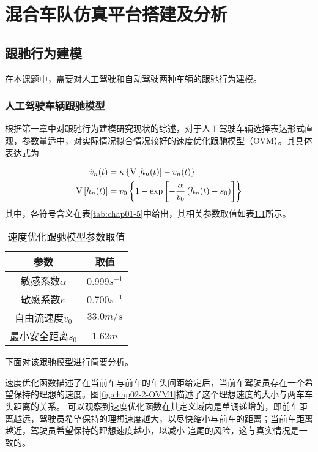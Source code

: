 
\chapter{混合车队仿真平台搭建及分析}

\section{跟驰行为建模}
\label{sec:2.2}

在本课题中，需要对人工驾驶和自动驾驶两种车辆的跟驰行为建模。

\subsection{人工驾驶车辆跟驰模型}

根据第一章中对跟驰行为建模研究现状的综述，对于人工驾驶车辆选择表达形式直观，参数量适中，对实际情况拟合情况较好的速度优化跟驰模型（OVM）。其具体表达式为

\begin{align}
  \dot{v}_n(t) &= \kappa \left\{ \mathrm{V} \left[ h_n(t) \right] - v_n(t) \right\} \notag \\
  \mathrm{V} \left[ h_n(t) \right] &= v_0 \left\{ 1 - \exp \left[ - \frac{\alpha}{v_0}\left(h_n(t)-s_0\right) \right] \right\}
  \label{eq:chap02-1}
\end{align}
其中，各符号含义在表\ref{tab:chap01-5}中给出，其相关参数取值如表\ref{tab:chap02-1}所示。

\begin{table}
  \centering
  \caption{速度优化跟驰模型参数取值}
  \begin{tabular}{cc}
    \toprule
    参数          &  取值                         \\
    \midrule
    敏感系数$\alpha$        & $0.999s^{-1}$         \\
    敏感系数$\kappa$       & $0.700s^{-1}$             \\
    自由流速度$v_0$             & $33.0 m/s$          \\
    最小安全距离$s_0$             & $1.62m$        \\
    \bottomrule
  \end{tabular}
  \label{tab:chap02-1}
\end{table}

下面对该跟驰模型进行简要分析。

速度优化函数描述了在当前车与前车的车头间距给定后，当前车驾驶员存在一个希望保持的理想的速度。图\ref{fig:chap02-2-OVM1}描述了这个理想速度的大小与两车车头距离的关系。
可以观察到速度优化函数在其定义域内是单调递增的，即前车距离越远，驾驶员希望保持的理想速度越大，以尽快缩小与前车的距离；当前车距离越近，驾驶员希望保持的理想速度越小，以减小
追尾的风险，这与真实情况是一致的。

